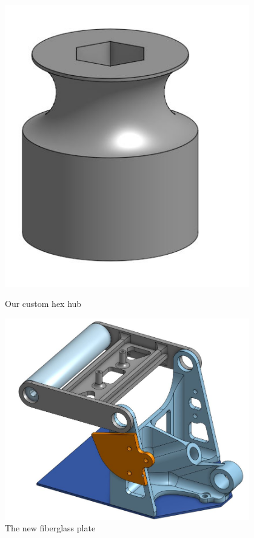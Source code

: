 \begin{figure}[ht]
\centering
\begin{minipage}[b]{.48\textwidth}
  \centering
  \includegraphics[width=0.95\textwidth]{Meetings/November/11-22-21/11-22-21_CAD_Figure3 - Nathan Forrer.JPG}
  \caption{Our custom hex hub}
  \label{fig:pic3}
\end{minipage}%
\hfill%
\begin{minipage}[b]{.48\textwidth}
  \centering
  \includegraphics[width=0.95\textwidth]{Meetings/November/11-22-21/11-22-21_CAD_Figure4 - Nathan Forrer.JPG}
  \caption{The new fiberglass plate}
  \label{fig:pic4}
\end{minipage}
\end{figure}


